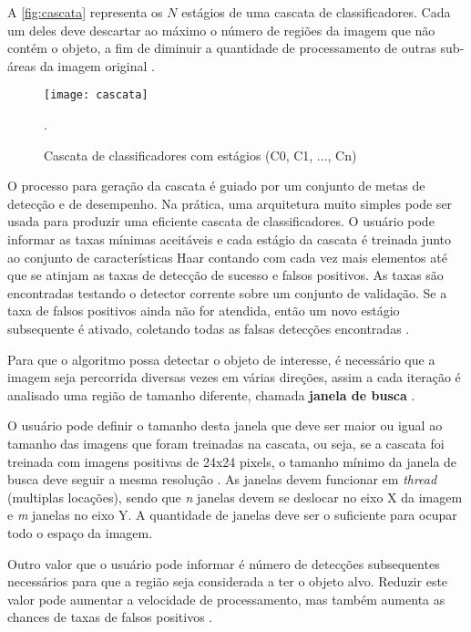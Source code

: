 A \autoref{fig:cascata} representa os $N$ estágios de uma cascata de classificadores. Cada um deles deve descartar ao máximo o número de regiões da imagem que não contém o objeto, a fim de diminuir a quantidade de processamento de outras sub-áreas da imagem original \cite{gustavo_cascata}.

 \begin{figure}[h]
	\centering
	\texttt{[image: cascata]}
	\caption{Cascata de classificadores com estágios (C0, C1, ..., Cn)}.
	\label{fig:cascata}
\end{figure}

O processo para geração da cascata é guiado por um conjunto de metas de detecção e de desempenho. Na prática, uma arquitetura muito simples pode ser usada para produzir uma eficiente cascata de classificadores. O usuário pode informar as taxas mínimas aceitáveis e cada estágio da cascata é treinada junto ao conjunto de características Haar contando com cada vez mais elementos até que se atinjam as taxas de detecção de sucesso e falsos positivos. As taxas são encontradas testando o detector corrente sobre um conjunto de validação. Se a taxa de falsos positivos ainda não for atendida, então um novo estágio subsequente é ativado, coletando todas as falsas detecções encontradas \cite{gustavo_cascata}.

Para que o algoritmo possa detectar o objeto de interesse, é necessário que a imagem seja percorrida diversas vezes em várias direções, assim a cada iteração é analisado uma região de tamanho diferente, chamada \textbf{janela de busca} \cite{gustavo_cascata}. 

O usuário pode definir o tamanho desta janela que deve ser maior ou igual ao tamanho das imagens que foram treinadas na cascata, ou seja, se a cascata foi treinada com imagens positivas de 24x24 pixels, o tamanho mínimo da janela de busca deve seguir a mesma resolução \cite{gustavo_cascata}. As janelas devem funcionar em \textit{thread} (multiplas locações), sendo que \textit{n} janelas devem se deslocar no eixo X da imagem e \textit{m} janelas no eixo Y. A quantidade de janelas deve ser o suficiente para ocupar todo o espaço da imagem.

Outro valor que o usuário pode informar é número de detecções subsequentes necessários para que a região seja considerada a ter o objeto alvo. Reduzir este valor pode aumentar a velocidade de processamento, mas também aumenta as chances de taxas de falsos positivos \cite{drmathew_java_programming}.

